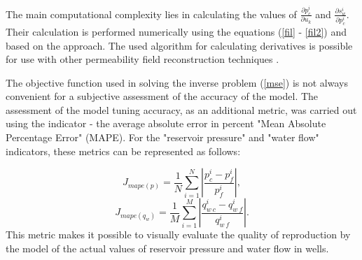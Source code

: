 \documentclass[
11pt,%
tightenlines,%
twoside,%
onecolumn,%
nofloats,%
nobibnotes,%
nofootinbib,%
superscriptaddress,%
noshowpacs,%
centertags]%
{revtex4}
\begin{document}
The main computational complexity lies in calculating the values of $\frac{\partial p_c^i}{\partial u_k}$ and $\frac{\partial s_w^i}{\partial p_c^i}$. Their calculation is performed numerically using the equations (\ref{fil} - \ref{fil2}) and based on the \cite{opt} approach. The used algorithm for calculating derivatives is possible for use with other permeability field reconstruction techniques \cite{leg}.

The objective function used in solving the inverse problem ({\ref{mse}}) is not always convenient for a subjective assessment of the accuracy of the model. The assessment of the model tuning accuracy, as an additional metric, was carried out using the indicator - the average absolute error in percent "Mean Absolute Percentage Error" (MAPE). For the "reservoir pressure" and "water flow" indicators, these metrics can be represented as follows:

\begin{equation*} \label{mape_p}
 	J_{mape(p)}=\frac{1}{N}\sum_{i=1}^N{\left|\frac{p_c^i-p_f^i}{p_f^i}\right|},
\end{equation*}
\begin{equation*} \label{mape_qo}
 	J_{mape(q_w)}=\frac{1}{M}\sum_{i=1}^M{\left|\frac{q_{w\:c}^i-q_{w\:f}^i}{q_{w\:f}^i}\right|}.
\end{equation*}
This metric makes it possible to visually evaluate the quality of reproduction by the model of the actual values of reservoir pressure and water flow in wells.
\end{document}
